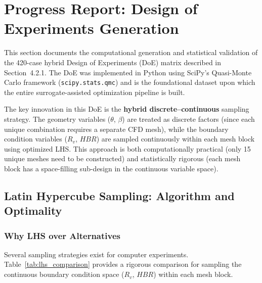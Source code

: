 \documentclass[12pt, a4paper]{report}
\begin{document}
\chapter{Progress Report: Design of Experiments Generation}

This section documents the computational generation and statistical validation of the 420-case hybrid Design of Experiments (DoE) matrix described in Section~4.2.1. The DoE was implemented in Python using SciPy's Quasi-Monte Carlo framework (\texttt{scipy.stats.qmc}) and is the foundational dataset upon which the entire surrogate-assisted optimization pipeline is built.

The key innovation in this DoE is the \textbf{hybrid discrete--continuous} sampling strategy. The geometry variables ($\theta$, $\beta$) are treated as discrete factors (since each unique combination requires a separate CFD mesh), while the boundary condition variables ($R_v$, $HBR$) are sampled continuously within each mesh block using optimized LHS. This approach is both computationally practical (only 15 unique meshes need to be constructed) and statistically rigorous (each mesh block has a space-filling sub-design in the continuous variable space).

\section{Latin Hypercube Sampling: Algorithm and Optimality}

\subsection{Why LHS over Alternatives}
Several sampling strategies exist for computer experiments. Table~\ref{tab:lhs_comparison} provides a rigorous comparison for sampling the continuous boundary condition space ($R_v$, $HBR$) within each mesh block.
\end{document}
